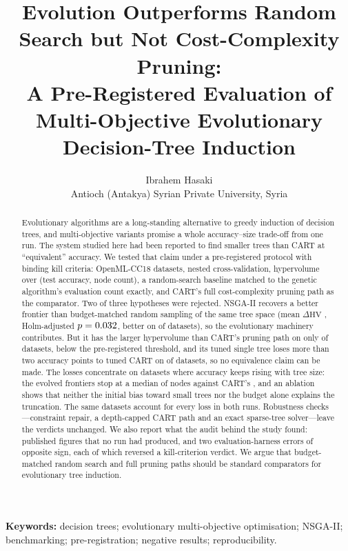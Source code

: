 \documentclass[11pt]{article}
\title{Evolution Outperforms Random Search but Not Cost-Complexity Pruning:\\
A Pre-Registered Evaluation of Multi-Objective Evolutionary Decision-Tree Induction}
\author{Ibrahem Hasaki\\
\small Antioch (Antakya) Syrian Private University, Syria}
\date{}
\newcommand{\hv}{\ensuremath{\mathrm{HV}}\xspace}
\begin{document}
\maketitle

\begin{abstract}
Evolutionary algorithms are a long-standing alternative to greedy induction of decision
trees, and multi-objective variants promise a whole accuracy--size trade-off from one run.
The system studied here had been reported to find smaller trees than CART at
``equivalent'' accuracy. We tested that claim under a pre-registered protocol with binding
kill criteria: \NDatasets{} OpenML-CC18 datasets, nested cross-validation, hypervolume over
(test accuracy, node count), a random-search baseline matched to the genetic algorithm's
evaluation count exactly, and CART's full cost-complexity pruning path as the comparator.
Two of three hypotheses were rejected. NSGA-II recovers a better frontier than
budget-matched random sampling of the same tree space (mean $\Delta\hv$ \KoneDiff,
Holm-adjusted $p=0.032$, better on \KoneWins{} of \NDatasets{} datasets), so the
evolutionary machinery contributes. But it has the larger hypervolume than CART's pruning
path on only \KtwoRate{} of datasets, below the pre-registered \KtwoThreshold{}
threshold, and its tuned single tree loses more than two accuracy points to tuned CART on
\KthreePrimary{} of \NDatasets{} datasets, so no equivalence claim can be made. The losses
concentrate on datasets where accuracy keeps rising with tree size: the evolved frontiers
stop at a median of \MedianMaxNodesGA{} nodes against CART's \MedianMaxNodesCart, and an
ablation shows that neither the initial bias toward small trees nor the budget alone
explains the truncation. The same datasets account for every loss in both runs.
Robustness checks---constraint repair, a depth-capped CART path and an exact sparse-tree
solver---leave the verdicts unchanged. We also report what the audit behind the study
found: published figures that no run had produced, and two evaluation-harness errors of
opposite sign, each of which reversed a kill-criterion verdict. We argue that
budget-matched random search and full pruning paths should be standard comparators for
evolutionary tree induction.
\end{abstract}

\noindent\textbf{Keywords:} decision trees; evolutionary multi-objective optimisation;
NSGA-II; benchmarking; pre-registration; negative results; reproducibility.

\end{document}
